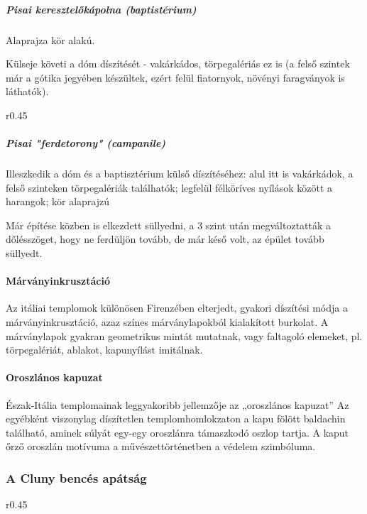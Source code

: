 	\subparagraph{Pisai keresztelőkápolna (baptistérium)}
	Alaprajza kör alakú.
	
	Külseje követi a dóm díszítését - vakárkádos, törpegalériás ez is
	(a felső szintek már a gótika jegyében készültek, ezért felül fiatornyok, növényi faragványok is láthatók).
	
	
	
	\begin{wrapfigure}{r}{0.45\textwidth}
	\end{wrapfigure}
	
	\subparagraph{Pisai "ferdetorony" (campanile)}
	Illeszkedik a dóm és a baptisztérium külső díszítéséhez: alul itt is vakárkádok, a felső szinteken törpegalériák találhatók; legfelül félköríves nyílások között a harangok; kör alaprajzú
		
	Már építése közben is elkezdett süllyedni, a 3 szint után megváltoztatták a dőlésszöget, hogy ne ferdüljön tovább, de már késő volt, az épület tovább süllyedt.
	
	\paragraph{Márványinkrusztáció}
	Az itáliai templomok különösen Firenzében elterjedt, gyakori díszítési módja a márványinkrusztáció, azaz színes márványlapokból kialakított burkolat. A márványlapok gyakran geometrikus mintát mutatnak, vagy faltagoló elemeket, pl. törpegalériát, ablakot, kapunyílást imitálnak.
	
	\paragraph{Oroszlános kapuzat}
	Észak-Itália templomainak leggyakoribb jellemzője az „oroszlános kapuzat”
	Az egyébként viszonylag díszítetlen templomhomlokzaton a kapu fölött baldachin található, aminek súlyát egy-egy oroszlánra támaszkodó oszlop tartja. A kaput őrző oroszlán motívuma a művészettörténetben a védelem szimbóluma.
	
	\subsubsection{A Cluny bencés apátság}
	
	\begin{wrapfigure}{r}{0.45\textwidth}
	\end{wrapfigure}
	
